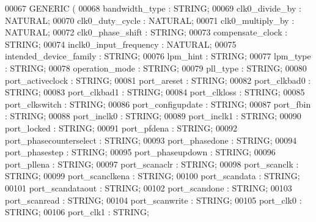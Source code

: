 \begin{DoxyCode}
{00067     \textcolor{keywordflow}{GENERIC} (
00068         bandwidth\_type      : \textcolor{comment}{STRING};
00069         clk0\_divide\_by      : \textcolor{comment}{NATURAL};
00070         clk0\_duty\_cycle     : \textcolor{comment}{NATURAL};
00071         clk0\_multiply\_by        : \textcolor{comment}{NATURAL};
00072         clk0\_phase\_shift        : \textcolor{comment}{STRING};
00073         compensate\_clock        : \textcolor{comment}{STRING};
00074         inclk0\_input\_frequency      : \textcolor{comment}{NATURAL};
00075         intended\_device\_family      : \textcolor{comment}{STRING};
00076         lpm\_hint        : \textcolor{comment}{STRING};
00077         lpm\_type        : \textcolor{comment}{STRING};
00078         operation\_mode      : \textcolor{comment}{STRING};
00079         pll\_type        : \textcolor{comment}{STRING};
00080         port\_activeclock        : \textcolor{comment}{STRING};
00081         port\_areset     : \textcolor{comment}{STRING};
00082         port\_clkbad0        : \textcolor{comment}{STRING};
00083         port\_clkbad1        : \textcolor{comment}{STRING};
00084         port\_clkloss        : \textcolor{comment}{STRING};
00085         port\_clkswitch      : \textcolor{comment}{STRING};
00086         port\_configupdate       : \textcolor{comment}{STRING};
00087         port\_fbin       : \textcolor{comment}{STRING};
00088         port\_inclk0     : \textcolor{comment}{STRING};
00089         port\_inclk1     : \textcolor{comment}{STRING};
00090         port\_locked     : \textcolor{comment}{STRING};
00091         port\_pfdena     : \textcolor{comment}{STRING};
00092         port\_phasecounterselect     : \textcolor{comment}{STRING};
00093         port\_phasedone      : \textcolor{comment}{STRING};
00094         port\_phasestep      : \textcolor{comment}{STRING};
00095         port\_phaseupdown        : \textcolor{comment}{STRING};
00096         port\_pllena     : \textcolor{comment}{STRING};
00097         port\_scanaclr       : \textcolor{comment}{STRING};
00098         port\_scanclk        : \textcolor{comment}{STRING};
00099         port\_scanclkena     : \textcolor{comment}{STRING};
00100         port\_scandata       : \textcolor{comment}{STRING};
00101         port\_scandataout        : \textcolor{comment}{STRING};
00102         port\_scandone       : \textcolor{comment}{STRING};
00103         port\_scanread       : \textcolor{comment}{STRING};
00104         port\_scanwrite      : \textcolor{comment}{STRING};
00105         port\_clk0       : \textcolor{comment}{STRING};
00106         port\_clk1       : \textcolor{comment}{STRING};
}
\end{DoxyCode}
